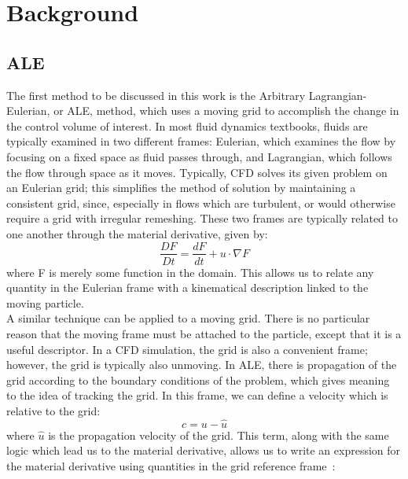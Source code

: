 \documentclass{article}
\def\deriv#1#2{\frac{d #1}{d #2}}
\begin{document}
 

\section{Background}

\subsection{ALE}

The first method to be discussed in this work is the Arbitrary Lagrangian-Eulerian, or ALE, method, which uses a moving grid to accomplish the change in the control volume of interest.  In most fluid dynamics textbooks, fluids are typically examined in two different frames: Eulerian, which examines the flow by focusing on a fixed space as fluid passes through, and Lagrangian, which follows the flow through space as it moves.  Typically, CFD solves its given problem on an Eulerian grid; this simplifies the method of solution by maintaining a consistent grid, since, especially in flows which are turbulent, or would otherwise require a grid with irregular remeshing.  These two frames are typically related to one another through the material derivative, given by:
\begin{equation}
  \frac{DF}{Dt} = \deriv{F}{t} + u \cdot \nabla F
\end{equation}
where F is merely some function in the domain.  This allows us to relate any quantity in the Eulerian frame with a kinematical description linked to the moving particle.  
\\
A similar technique can be applied to a moving grid.  There is no particular reason that the moving frame must be attached to the particle, except that it is a useful descriptor.  In a CFD simulation, the grid is also a convenient frame; however, the grid is typically also unmoving.  In ALE, there is propagation of the grid according to the boundary conditions of the problem, which gives meaning to the idea of tracking the grid.  In this frame, we can define a velocity which is relative to the grid:
\begin{equation}
  c = u - \hat{u}
\end{equation}
where $\hat{u}$ is the propagation velocity of the grid.  This term, along with the same logic which lead us to the material derivative, allows us to write an expression for the material derivative using quantities in the grid reference frame~\cite{sarrate01}:
\end{document}
